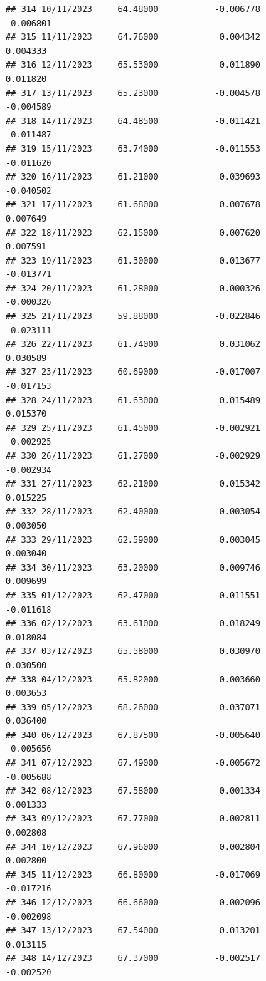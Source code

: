\documentclass[
]{article}
\begin{document}
\begin{verbatim}
## 314 10/11/2023     64.48000           -0.006778               -0.006801
## 315 11/11/2023     64.76000            0.004342                0.004333
## 316 12/11/2023     65.53000            0.011890                0.011820
## 317 13/11/2023     65.23000           -0.004578               -0.004589
## 318 14/11/2023     64.48500           -0.011421               -0.011487
## 319 15/11/2023     63.74000           -0.011553               -0.011620
## 320 16/11/2023     61.21000           -0.039693               -0.040502
## 321 17/11/2023     61.68000            0.007678                0.007649
## 322 18/11/2023     62.15000            0.007620                0.007591
## 323 19/11/2023     61.30000           -0.013677               -0.013771
## 324 20/11/2023     61.28000           -0.000326               -0.000326
## 325 21/11/2023     59.88000           -0.022846               -0.023111
## 326 22/11/2023     61.74000            0.031062                0.030589
## 327 23/11/2023     60.69000           -0.017007               -0.017153
## 328 24/11/2023     61.63000            0.015489                0.015370
## 329 25/11/2023     61.45000           -0.002921               -0.002925
## 330 26/11/2023     61.27000           -0.002929               -0.002934
## 331 27/11/2023     62.21000            0.015342                0.015225
## 332 28/11/2023     62.40000            0.003054                0.003050
## 333 29/11/2023     62.59000            0.003045                0.003040
## 334 30/11/2023     63.20000            0.009746                0.009699
## 335 01/12/2023     62.47000           -0.011551               -0.011618
## 336 02/12/2023     63.61000            0.018249                0.018084
## 337 03/12/2023     65.58000            0.030970                0.030500
## 338 04/12/2023     65.82000            0.003660                0.003653
## 339 05/12/2023     68.26000            0.037071                0.036400
## 340 06/12/2023     67.87500           -0.005640               -0.005656
## 341 07/12/2023     67.49000           -0.005672               -0.005688
## 342 08/12/2023     67.58000            0.001334                0.001333
## 343 09/12/2023     67.77000            0.002811                0.002808
## 344 10/12/2023     67.96000            0.002804                0.002800
## 345 11/12/2023     66.80000           -0.017069               -0.017216
## 346 12/12/2023     66.66000           -0.002096               -0.002098
## 347 13/12/2023     67.54000            0.013201                0.013115
## 348 14/12/2023     67.37000           -0.002517               -0.002520

\end{verbatim}
\end{document}
